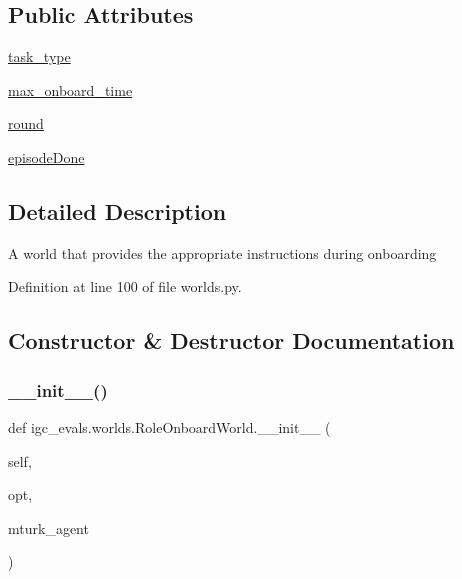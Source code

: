 \subsection*{Public Attributes}
\begin{DoxyCompactItemize}
\item 
\hyperlink{classigc__evals_1_1worlds_1_1RoleOnboardWorld_aa4474e6170fb62445d09455a09377b1c}{task\+\_\+type}
\item 
\hyperlink{classigc__evals_1_1worlds_1_1RoleOnboardWorld_ac1d2cbbaa66cf111ba39cbd112448b99}{max\+\_\+onboard\+\_\+time}
\item 
\hyperlink{classigc__evals_1_1worlds_1_1RoleOnboardWorld_ae6b8b37395e2430f1d533b6fc4cee64e}{round}
\item 
\hyperlink{classigc__evals_1_1worlds_1_1RoleOnboardWorld_a5746dc1a7d35c4a525c8fd2f5f20e149}{episode\+Done}
\end{DoxyCompactItemize}


\subsection{Detailed Description}
\begin{DoxyVerb}A world that provides the appropriate instructions during onboarding\end{DoxyVerb}
 

Definition at line 100 of file worlds.\+py.



\subsection{Constructor \& Destructor Documentation}
\mbox{\label{classigc__evals_1_1worlds_1_1RoleOnboardWorld_a7842fc40e237a810c8e281c63b176324}} 
\subsubsection{\texorpdfstring{\+\_\+\+\_\+init\+\_\+\+\_\+()}{\_\_init\_\_()}}
{\footnotesize\ttfamily def igc\+\_\+evals.\+worlds.\+Role\+Onboard\+World.\+\_\+\+\_\+init\+\_\+\+\_\+ (\begin{DoxyParamCaption}\item[{}]{self,  }\item[{}]{opt,  }\item[{}]{mturk\+\_\+agent }\end{DoxyParamCaption})}



